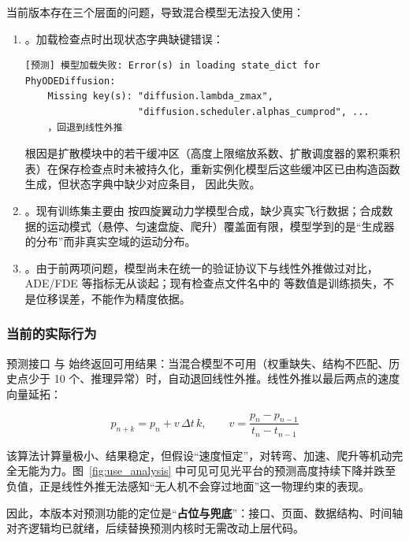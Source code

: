 当前版本存在三个层面的问题，导致混合模型无法投入使用：

\begin{enumerate}
  \item {}。加载检查点时出现状态字典缺键错误：
\begin{lstlisting}[style=sh, caption={混合模型加载失败的运行日志（节选）}]
[预测] 模型加载失败: Error(s) in loading state_dict for PhyODEDiffusion:
    Missing key(s): "diffusion.lambda_zmax",
                    "diffusion.scheduler.alphas_cumprod", ...
    ，回退到线性外推
\end{lstlisting}
  根因是扩散模块中的若干缓冲区（高度上限缩放系数、扩散调度器的累积乘积表）在保存检查点时未被持久化，重新实例化模型后这些缓冲区已由构造函数生成，但状态字典中缺少对应条目， 因此失败。

  \item {}。现有训练集主要由  按四旋翼动力学模型合成，缺少真实飞行数据；合成数据的运动模式（悬停、匀速盘旋、爬升）覆盖面有限，模型学到的是“生成器的分布”而非真实空域的运动分布。

  \item {}。由于前两项问题，模型尚未在统一的验证协议下与线性外推做过对比，ADE/FDE 等指标无从谈起；现有检查点文件名中的  等数值是训练损失，不是位移误差，不能作为精度依据。
\end{enumerate}

\subsubsection{当前的实际行为}

预测接口  与  始终返回可用结果：当混合模型不可用（权重缺失、结构不匹配、历史点少于 10 个、推理异常）时，自动退回线性外推。线性外推以最后两点的速度向量延拓：

\begin{equation}
p_{n+k}=p_n+v\,\Delta t\,k,\qquad v=\frac{p_n-p_{n-1}}{t_n-t_{n-1}}
\end{equation}

该算法计算量极小、结果稳定，但假设“速度恒定”，对转弯、加速、爬升等机动完全无能为力。图~\ref{fig:use_analysis} 中可见可见光平台的预测高度持续下降并跌至负值，正是线性外推无法感知“无人机不会穿过地面”这一物理约束的表现。

因此，本版本对预测功能的定位是“\textbf{占位与兜底}”：接口、页面、数据结构、时间轴对齐逻辑均已就绪，后续替换预测内核时无需改动上层代码。

